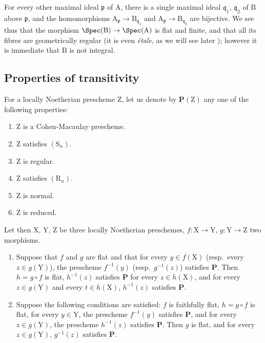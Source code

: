 \begin{remarks}[6.5.5]
\begin{enumerate}[label=(\roman*)]
For every other maximal ideal $\mathfrak{p}$ of $\mathrm{A}$, there is a single maximal ideal $\mathfrak{q}_1$, $\mathfrak{q}_2$ of $\mathrm{B}$ above $\mathfrak{p}$, and the homomorphisms $\mathrm{A}_\mathfrak{p}\to\mathrm{B}_{\mathfrak{q}_1}$ and $\mathrm{A}_\mathfrak{p}\to\mathrm{B}_{\mathfrak{q}_2}$ are bijective.
We see thus that the morphism $\Spec(\mathrm{B})\to\Spec(\mathrm{A})$ is flat and finite, and that all its fibres are geometrically regular (it is even \emph{\'etale}, as we will see later ); however it is immediate that $\mathrm{B}$ is not integral.
\end{enumerate}
\end{remarks}

\subsection{Properties of transitivity}
\label{subsection:IV.6.6}

\begin{proposition}[6.6.1]
\label{IV.6.6.1}
For a locally Noetherian prescheme $\mathrm{Z}$, let us denote by $\boldsymbol{P}(\mathrm{Z})$ any one of the following properties:
\begin{enumerate}[label=\emph{\alph*)}]
  \item $\mathrm{Z}$ is a Cohen-Macaulay prescheme.
  \item $\mathrm{Z}$ satisfies $(\mathrm{S}_n)$.
  \item $\mathrm{Z}$ is regular.
  \item $\mathrm{Z}$ satisfies $(\mathrm{R}_n)$.
  \item $\mathrm{Z}$ is normal.
  \item $\mathrm{Z}$ is reduced.
\end{enumerate}
Let then $\mathrm{X}$, $\mathrm{Y}$, $\mathrm{Z}$ be three locally Noetherian preschemes, $f:\mathrm{X}\to\mathrm{Y}$, $g:\mathrm{Y}\to\mathrm{Z}$ two morphisms.
\begin{enumerate}[label=(\roman*)]
  \item Suppose that $f$ and $g$ are flat and that for every $y\in f(\mathrm{X})$ \textnormal{(}resp.\ every $z\in g(\mathrm{Y})$\textnormal{)}, the prescheme $f^{-1}(y)$ \textnormal{(}resp.\ $g^{-1}(z)$\textnormal{)} satisfies $\boldsymbol{P}$. Then $h=g\circ f$ is flat, $h^{-1}(z)$ satisfies $\boldsymbol{P}$ for every $z\in h(\mathrm{X})$, and for every $z\in g(\mathrm{Y})$ and every $t\in h(\mathrm{X})$, $h^{-1}(z)$ satisfies $\boldsymbol{P}$.

  \item Suppose the following conditions are satisfied: $f$ is faithfully flat, $h=g\circ f$ is flat, for every $y\in\mathrm{Y}$, the prescheme $f^{-1}(y)$ satisfies $\boldsymbol{P}$, and for every $z\in g(\mathrm{Y})$, the prescheme $h^{-1}(z)$ satisfies $\boldsymbol{P}$. Then $g$ is flat, and for every $z\in g(\mathrm{Y})$, $g^{-1}(z)$ satisfies $\boldsymbol{P}$.
\end{enumerate}
\end{proposition}

